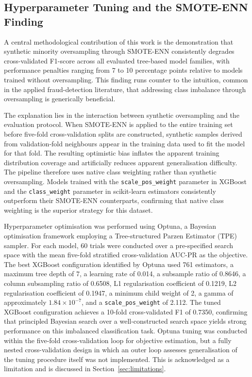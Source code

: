 \subsection{Hyperparameter Tuning and the SMOTE-ENN Finding}

A central methodological contribution of this work is the demonstration that synthetic minority oversampling through SMOTE-ENN consistently degrades cross-validated F1-score across all evaluated tree-based model families, with performance penalties ranging from 7 to 10 percentage points relative to models trained without oversampling. This finding runs counter to the intuition, common in the applied fraud-detection literature, that addressing class imbalance through oversampling is generically beneficial.

The explanation lies in the interaction between synthetic oversampling and the evaluation protocol. When SMOTE-ENN is applied to the entire training set before five-fold cross-validation splits are constructed, synthetic samples derived from validation-fold neighbours appear in the training data used to fit the model for that fold. The resulting optimistic bias inflates the apparent training distribution coverage and artificially reduces apparent generalisation difficulty. The pipeline therefore uses native class weighting rather than synthetic oversampling. Models trained with the \texttt{scale\_pos\_weight} parameter in XGBoost and the \texttt{class\_weight} parameter in scikit-learn estimators consistently outperform their SMOTE-ENN counterparts, confirming that native class weighting is the superior strategy for this dataset.

Hyperparameter optimisation was performed using Optuna, a Bayesian optimisation framework employing a Tree-structured Parzen Estimator (TPE) sampler. For each model, 60 trials were conducted over a pre-specified search space with the mean five-fold stratified cross-validation AUC-PR as the objective. The best XGBoost configuration identified by Optuna used 761 estimators, a maximum tree depth of 7, a learning rate of 0.014, a subsample ratio of 0.8646, a column subsampling ratio of 0.6508, L1 regularisation coefficient of 0.1219, L2 regularisation coefficient of 0.1947, a minimum child weight of 2, a gamma of approximately $1.84 \times 10^{-7}$, and a \texttt{scale\_pos\_weight} of 2.112. The tuned XGBoost configuration achieves a 10-fold cross-validated F1 of 0.7350, confirming that principled Bayesian search over a well-constructed search space yields strong performance on this imbalanced classification task. Optuna tuning was conducted within the five-fold cross-validation loop for objective estimation, but a fully nested cross-validation design in which an outer loop assesses generalisation of the tuning procedure itself was not implemented. This is acknowledged as a limitation and is discussed in Section~\ref{sec:limitations}.

